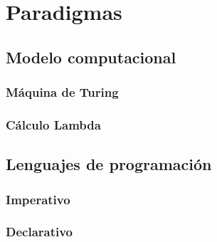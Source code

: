 
\chapter{Paradigmas}


\section{Modelo computacional}

\subsection{Máquina de Turing}

\subsection{Cálculo Lambda}


\section{Lenguajes de programación}

\subsection{Imperativo}

\subsection{Declarativo}